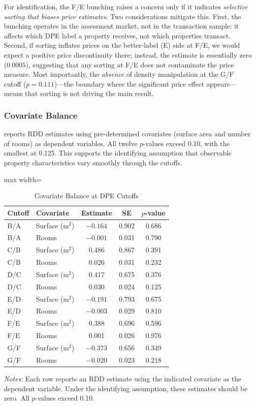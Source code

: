 \documentclass[12pt]{article}
\begin{document}
For identification, the F/E bunching raises a concern only if it indicates \textit{selective sorting that biases price estimates}. Two considerations mitigate this. First, the bunching operates in the assessment market, not in the transaction sample: it affects which DPE label a property receives, not which properties transact. Second, if sorting inflates prices on the better-label (E) side at F/E, we would expect a positive price discontinuity there; instead, the estimate is essentially zero ($0.0005$), suggesting that any sorting at F/E does not contaminate the price measure. Most importantly, the \textit{absence} of density manipulation at the G/F cutoff ($p = 0.111$)---the boundary where the significant price effect appears---means that sorting is not driving the main result.

\subsubsection{Covariate Balance}

 reports RDD estimates using pre-determined covariates (surface area and number of rooms) as dependent variables. All twelve $p$-values exceed 0.10, with the smallest at 0.125. This supports the identifying assumption that observable property characteristics vary smoothly through the cutoffs.

\begin{table}[htbp]
\centering
\caption{Covariate Balance at DPE Cutoffs}
\label{tab:balance}
\begin{adjustbox}{max width=\textwidth}
\begin{tabular}{l l c c c}
\hline\hline
Cutoff & Covariate & Estimate & SE & $p$-value \\
\hline
B/A & Surface (m$^2$) & $-0.164$ & 0.902 & 0.686 \\
B/A & Rooms & $-0.001$ & 0.031 & 0.790 \\
C/B & Surface (m$^2$) & 0.486 & 0.867 & 0.391 \\
C/B & Rooms & 0.026 & 0.031 & 0.232 \\
D/C & Surface (m$^2$) & 0.417 & 0.675 & 0.376 \\
D/C & Rooms & 0.030 & 0.024 & 0.125 \\
E/D & Surface (m$^2$) & $-0.191$ & 0.793 & 0.675 \\
E/D & Rooms & $-0.003$ & 0.029 & 0.810 \\
F/E & Surface (m$^2$) & 0.388 & 0.696 & 0.596 \\
F/E & Rooms & 0.001 & 0.026 & 0.976 \\
G/F & Surface (m$^2$) & $-0.373$ & 0.656 & 0.349 \\
G/F & Rooms & $-0.020$ & 0.023 & 0.218 \\
\hline\hline
\end{tabular}
\end{adjustbox}
\begin{minipage}{0.9\textwidth}
\small\textit{Notes:} Each row reports an RDD estimate using the indicated covariate as the dependent variable. Under the identifying assumption, these estimates should be zero. All $p$-values exceed 0.10.
\end{minipage}
\end{table}
\end{document}
